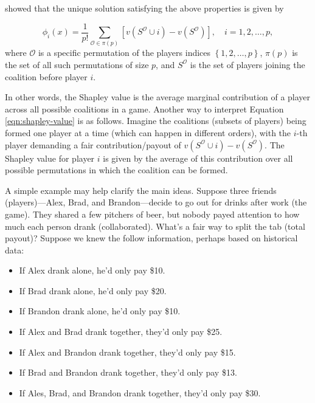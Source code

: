 \citep{shapley-2016-value} showed that the unique solution satisfying
the above properties is given by

\begin{equation}
\label{eqn:shapley-value}
\phi_i\left(x\right) = \frac{1}{p!} \sum_{\mathcal{O} \in \pi\left(p\right)} \left[v\left(S^\mathcal{O} \cup i\right) - v\left(S^\mathcal{O}\right)\right], \quad i = 1, 2, \dots, p,
\end{equation} where \(\mathcal{O}\) is a specific permutation of the
players indices \(\left\{1, 2, \dots, p\right\}\), \(\pi\left(p\right)\)
is the set of all such permutations of size \(p\), and \(S^\mathcal{O}\)
is the set of players joining the coalition before player \(i\).

In other words, the Shapley value is the average marginal contribution
of a player across all possible coalitions in a game. Another way to
interpret Equation \eqref{eqn:shapley-value} is as follows. Imagine the
coalitions (subsets of players) being formed one player at a time (which
can happen in different orders), with the \(i\)-th player demanding a
fair contribution/payout of
\(v\left(S^\mathcal{O} \cup i\right) - v\left(S^\mathcal{O}\right)\).
The Shapley value for player \(i\) is given by the average of this
contribution over all possible permutations in which the coalition can
be formed.

A simple example may help clarify the main ideas. Suppose three friends
(players)---Alex, Brad, and Brandon---decide to go out for drinks after
work (the game). They shared a few pitchers of beer, but nobody payed
attention to how much each person drank (collaborated). What's a fair
way to split the tab (total payout)? Suppose we knew the follow
information, perhaps based on historical data:

\begin{itemize}

  \item If Alex drank alone, he'd only pay \$10.
  
  \item If Brad drank alone, he'd only pay \$20.
  
  \item If Brandon drank alone, he'd only pay \$10.
  
  \item If Alex and Brad drank together, they'd only pay \$25.
  
  \item If Alex and Brandon drank together, they'd only pay \$15.
  
  \item If Brad and Brandon drank together, they'd only pay \$13.
  
  \item If Ales, Brad, and Brandon drank together, they'd only pay \$30.

\end{itemize}

